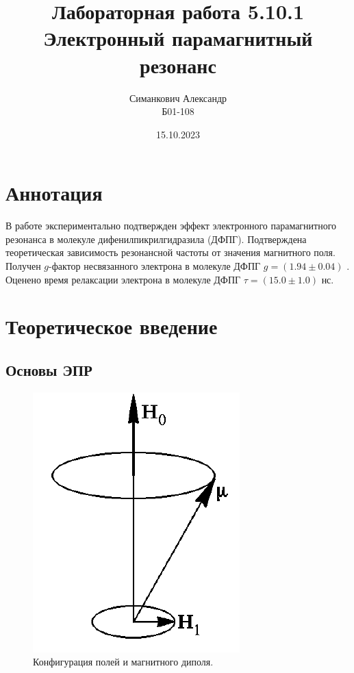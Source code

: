 \documentclass[12pt,a4paper]{article}
\title{Лабораторная работа 5.10.1 \\ Электронный парамагнитный резонанс}
\author{Симанкович Александр\\ Б01-108}
\date{15.10.2023}
\begin{document}
	\maketitle
	
	\section*{Аннотация}
	
	В работе экспериментально подтвержден эффект электронного парамагнитного резонанса в молекуле дифенилпикрилгидразила (ДФПГ). Подтверждена теоретическая зависимость резонансной частоты от значения магнитного поля. Получен $g$-фактор несвязанного электрона в молекуле ДФПГ $g = (1.94 \pm 0.04)$ . Оценено время релаксации электрона в молекуле ДФПГ $\tau = (15.0 \pm 1.0)$ нс.
	
	\section*{Теоретическое введение}
	
	\subsection*{Основы ЭПР}
	
	\begin{figure}
		\includegraphics[scale=0.6]{res/epr.png}
		\caption{Конфигурация полей и магнитного диполя.}
		\label{fig:epr_theory}
		\vspace{0pt}
	\end{figure}
\end{document}
